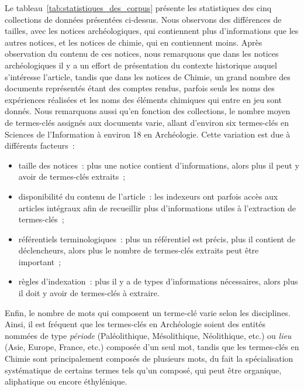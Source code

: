   Le tableau~\ref{tab:statistiques_des_corpus} présente les statistiques des
  cinq collections de données présentées ci-dessus. Nous observons des
  différences de tailles, avec les notices archéologiques, qui contiennent plus
  d'informations que les autres notices, et les notices de chimie, qui en
  contiennent moins. Après observation du contenu de ces notices, nous
  remarquons que dans les notices archéologiques il y a un effort de
  présentation du contexte historique auquel s'intéresse l'article, tandis que
  dans les notices de Chimie, un grand nombre des documents représentés étant
  des comptes rendus, parfois seuls les noms des expériences réalisées et les
  noms des éléments chimiques qui entre en jeu sont donnés. Nous remarquons
  aussi qu'en fonction des collections, le nombre moyen de termes-clés assignés
  aux documents varie, allant d'environ six termes-clés en Sciences de
  l'Information à environ 18 en Archéologie. Cette variation est due à
  différents facteurs~:
  \begin{itemize}
    \item{taille des notices~: plus une notice contient d'informations, alors
          plus il peut y avoir de termes-clés extraits~;}
    \item{disponibilité du contenu de l'article~: les indexeurs ont parfois
          accès aux articles intégraux afin de recueillir plus d'informations
          utiles à l'extraction de termes-clés~;}
    \item{référentiels terminologiques~: plus un référentiel est précis, plus il
          contient de déclencheurs, alors plus le nombre de termes-clés extraits
          peut être important~;}
    \item{règles d'indexation~: plus il y a de types d'informations nécessaires,
          alors plus il doit y avoir de termes-clés à extraire.}
  \end{itemize}
  Enfin, le nombre de mots qui composent un terme-clé varie selon les
  disciplines. Ainsi, il est fréquent que les termes-clés en Archéologie soient
  des entités nommées de type \textit{période} (\og{}Paléolithique\fg{},
  \og{}Mésolithique\fg{}, \og{}Néolithique\fg{}, etc.) ou \textit{lieu}
  (\og{}Asie\fg{}, \og{}Europe\fg{}, \og{}France\fg{}, etc.) composée d'un seul
  mot, tandis que les termes-clés en Chimie sont principalement composés de
  plusieurs mots, du fait la spécialisation systématique de certains termes tels
  qu'un \og{}composé\fg{}, qui peut être \og{}organique\fg{},
  \og{}aliphatique\fg{} ou encore \og{}éthylénique\fg{}.
